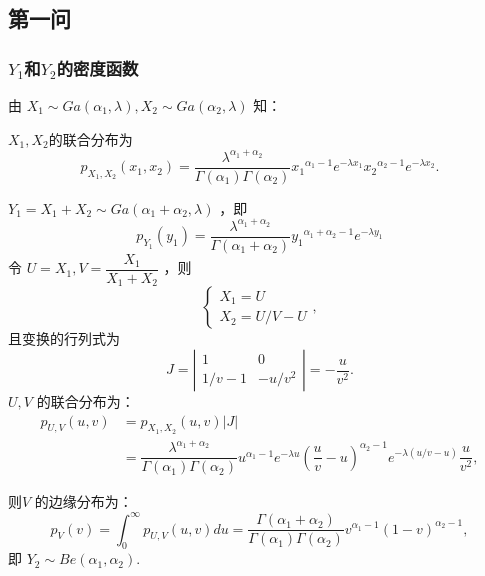\subsection{第一问}
\begin{frame}[t,allowframebreaks]
    \frametitle{$Y_1$和$Y_2$的密度函数}
        由 $X_1 \sim Ga(\alpha_1,\lambda),X_2\sim Ga(\alpha_2,\lambda)$ 知：

        $X_1,X_2 $的联合分布为
        \[
            p_{X_1,X_2}(x_1,x_2)=\dfrac{\lambda^{\alpha_1+\alpha_2}}{\Gamma(\alpha_1)\Gamma(\alpha_2)}{x_1}^{\alpha_1-1}e^{-\lambda x_1}{x_2}^{\alpha_2-1}e^{-\lambda x_2}.
        \]

        $Y_1=X_1+X_2 \sim Ga(\alpha_1+\alpha_2,\lambda)$ ，即
        \[
            p_{Y_1}(y_1)=\dfrac{\lambda^{\alpha_1+\alpha_2}}{\Gamma(\alpha_1+\alpha_2)}{y_1}^{\alpha_1+\alpha_2-1}e^{-\lambda y_1}
        \]
        令 $U=X_1,V=\dfrac{X_1}{X_1+X_2}$ ，则 
        \[
            \left\{ \begin{array}{ll} X_{1}=U \\ X_{2}=U/V-U \end{array}\right.,
        \]
        且变换的行列式为 
        \[
            J= \left | \begin{array}{ccc} 1 & 0 \\ 1/v-1 & -u/v^2 \end{array} \right |=-\dfrac{u}{v^2}.
        \]
        $U,V$ 的联合分布为： 
        \[
            \begin{aligned} p_{U,V}(u,v)&=p_{X_1,X_2}(u,v)|J| \\ &=\dfrac{\lambda^{\alpha_1+\alpha_2}}{\Gamma(\alpha_1)\Gamma(\alpha_2)}u^{\alpha_1-1}e^{-\lambda u}(\dfrac{u}{v}-u)^{\alpha_2-1}e^{-\lambda (u/v-u) }\dfrac{u}{v^2}, \end{aligned}
        \]
        
        则$ V$ 的边缘分布为： 
        \[
            p_{V}(v)=\int_0^{\infty} p_{U,V}(u,v)du=\dfrac{\Gamma(\alpha_1+\alpha_2)}{\Gamma(\alpha_1)\Gamma(\alpha_2)}v^{\alpha_1-1}(1-v)^{\alpha_2-1},
        \]
        即 $Y_2 \sim Be(\alpha_1,\alpha_2) .$
\end{frame}
